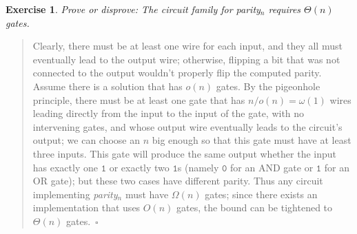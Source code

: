 \documentclass{article}
\theoremstyle{break}			%
\newtheorem{exercise}{Exercise}
\theoremstyle{plain}
\newenvironment{answer}{\begin{quotation}\noindent}{\end{quotation}}
\newcommand{\qed}{~\ensuremath{\square}}
\newcommand{\sym}[1]{\ensuremath{\mathtt{#1}}}
\begin{document}
\begin{exercise}
Prove or disprove: The circuit family for \textit{parity}$_n$ requires
$\Theta(n)$ gates.
\end{exercise}
\begin{answer}
Clearly, there must be at least one wire for each input, and they all
must eventually lead to the output wire; otherwise, flipping a bit
that was not connected to the output wouldn't properly flip the
computed parity.  Assume there is a solution that has $o(n)$ gates.
By the pigeonhole principle, there must be at least one gate that has
$n/o(n)=\omega(1)$ wires leading directly from the input to the input
of the gate, with no intervening gates, and whose output wire
eventually leads to the circuit's output; we can choose an $n$ big
enough so that this gate must have at least three inputs.  This gate
will produce the same output whether the input has exactly one \sym 1
or exactly two \sym 1s (namely \sym 0 for an AND gate or \sym 1 for an
OR gate); but these two cases have different parity.  Thus any circuit
implementing \textit{parity}$_n$ must have $\Omega(n)$ gates; since
there exists an implementation that uses $O(n)$ gates, the bound can
be tightened to $\Theta(n)$ gates.\qed
\end{answer}
\end{document}
